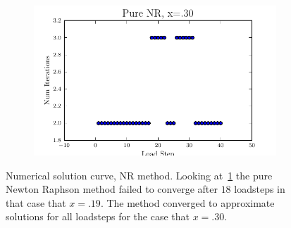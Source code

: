 \documentclass[10pt,letterpaper]{article}
\begin{document}
\begin{figure}[!tbh]
\begin{subfigure}[b]{.6\textwidth}
    \caption{}
    \label{fig2:label:c}
  \end{subfigure}
  \hfill
  \begin{subfigure}[b]{.6\textwidth}
    \includegraphics[width=1\textwidth]{pure_nr_x30_conv.pdf}
    \caption{}
    \label{fig2:label:d}
  \end{subfigure}
  \caption{Numerical solution curve, NR method. Looking at~\ref{fig2:label:c} the pure Newton Raphson method failed to converge after $18$ loadsteps in that case that $x=.19$. The method converged to approximate solutions for all loadsteps for the case that $x=.30$.
}
\end{figure}
\end{document}
